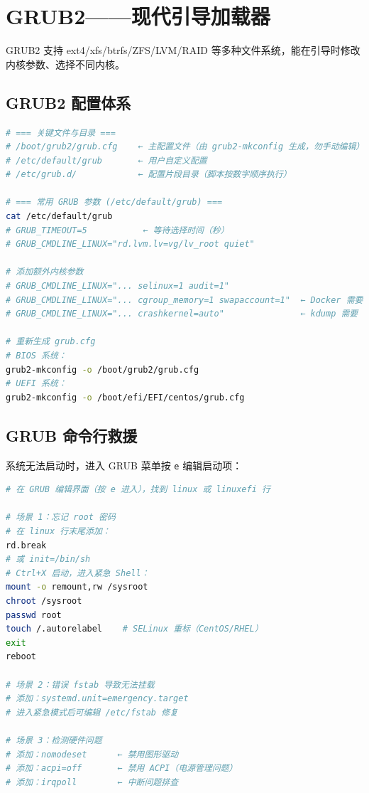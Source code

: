 \documentclass[12pt,UTF8]{ctexbook}
\begin{document}
\section{GRUB2——现代引导加载器}
\label{sec:grub2}

GRUB2 支持 ext4/xfs/btrfs/ZFS/LVM/RAID 等多种文件系统，能在引导时修改内核参数、选择不同内核。

\subsection{GRUB2 配置体系}

\begin{lstlisting}[language=bash]
# === 关键文件与目录 ===
# /boot/grub2/grub.cfg    ← 主配置文件（由 grub2-mkconfig 生成，勿手动编辑）
# /etc/default/grub       ← 用户自定义配置
# /etc/grub.d/            ← 配置片段目录（脚本按数字顺序执行）

# === 常用 GRUB 参数 (/etc/default/grub) ===
cat /etc/default/grub
# GRUB_TIMEOUT=5           ← 等待选择时间（秒）
# GRUB_CMDLINE_LINUX="rd.lvm.lv=vg/lv_root quiet"

# 添加额外内核参数
# GRUB_CMDLINE_LINUX="... selinux=1 audit=1"
# GRUB_CMDLINE_LINUX="... cgroup_memory=1 swapaccount=1"  ← Docker 需要
# GRUB_CMDLINE_LINUX="... crashkernel=auto"               ← kdump 需要

# 重新生成 grub.cfg
# BIOS 系统：
grub2-mkconfig -o /boot/grub2/grub.cfg
# UEFI 系统：
grub2-mkconfig -o /boot/efi/EFI/centos/grub.cfg
\end{lstlisting}

\subsection{GRUB 命令行救援}

系统无法启动时，进入 GRUB 菜单按 \texttt{e} 编辑启动项：

\begin{lstlisting}[language=bash]
# 在 GRUB 编辑界面（按 e 进入），找到 linux 或 linuxefi 行

# 场景 1：忘记 root 密码
# 在 linux 行末尾添加：
rd.break
# 或 init=/bin/sh
# Ctrl+X 启动，进入紧急 Shell：
mount -o remount,rw /sysroot
chroot /sysroot
passwd root
touch /.autorelabel    # SELinux 重标（CentOS/RHEL）
exit
reboot

# 场景 2：错误 fstab 导致无法挂载
# 添加：systemd.unit=emergency.target
# 进入紧急模式后可编辑 /etc/fstab 修复

# 场景 3：检测硬件问题
# 添加：nomodeset      ← 禁用图形驱动
# 添加：acpi=off       ← 禁用 ACPI（电源管理问题）
# 添加：irqpoll        ← 中断问题排查
\end{lstlisting}
\end{document}
